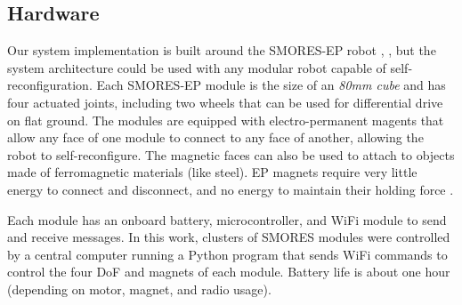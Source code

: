 \documentclass[conference]{IEEEtran}
\begin{document}
%


\subsection{Hardware} %
\label{sec:hardware}
%
%

Our system implementation is built around the SMORES-EP robot \cite{tosun2016design},
\cite{tosun2017paintpots}, but the system architecture could
be used with any modular robot capable of self-reconfiguration. Each SMORES-EP module is the size of an \textit{80mm cube}
and has four actuated joints, including two wheels that can be
used for differential drive on flat ground.  The modules are equipped
with electro-permanent magents that allow any face of one module to connect to
any face of another, allowing the robot to self-reconfigure. The magnetic faces
can also be used to attach to objects made of ferromagnetic materials (like steel). 
EP magnets require very little energy to connect and disconnect, and no energy to maintain their
holding force \cite{tosun2016design}.

Each module has an onboard battery, microcontroller, and WiFi
module to send and receive messages.  In this work, clusters of SMORES
modules were controlled by a central computer running a Python program that
sends WiFi commands to control the four DoF and magnets of each module.
Battery life is about one hour (depending on motor, magnet, and radio usage).


%
%
\end{document}
